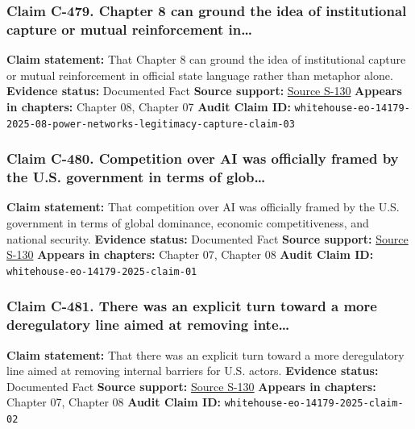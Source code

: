 \documentclass[
  american,
  11pt,
  letterpaper,
]{article}
\begin{document}
\subsubsection{Claim C-479. Chapter 8 can ground the idea of
institutional capture or mutual reinforcement
in\ldots{}}\label{claim-c-479-chapter-8-can-ground-the-idea-of-institutional-capture-or-mutual-reinforcement-in}

\textbf{Claim statement:} That Chapter 8 can ground the idea of
institutional capture or mutual reinforcement in official state language
rather than metaphor alone. \textbf{Evidence status:} Documented Fact
\textbf{Source support:}
\hyperref[source-s-130-removing-barriers-to-american-leadership-in-artificial-intelligence]{Source
S-130} \textbf{Appears in chapters:} Chapter 08, Chapter 07
\textbf{Audit Claim ID:}
\texttt{whitehouse-eo-14179-2025-08-power-networks-legitimacy-capture-claim-03}

\subsubsection{Claim C-480. Competition over AI was officially framed by
the U.S. government in terms of
glob\ldots{}}\label{claim-c-480-competition-over-ai-was-officially-framed-by-the-u-s-government-in-terms-of-glob}

\textbf{Claim statement:} That competition over AI was officially framed
by the U.S. government in terms of global dominance, economic
competitiveness, and national security. \textbf{Evidence status:}
Documented Fact \textbf{Source support:}
\hyperref[source-s-130-removing-barriers-to-american-leadership-in-artificial-intelligence]{Source
S-130} \textbf{Appears in chapters:} Chapter 07, Chapter 08
\textbf{Audit Claim ID:} \texttt{whitehouse-eo-14179-2025-claim-01}

\subsubsection{Claim C-481. There was an explicit turn toward a more
deregulatory line aimed at removing
inte\ldots{}}\label{claim-c-481-there-was-an-explicit-turn-toward-a-more-deregulatory-line-aimed-at-removing-inte}

\textbf{Claim statement:} That there was an explicit turn toward a more
deregulatory line aimed at removing internal barriers for U.S. actors.
\textbf{Evidence status:} Documented Fact \textbf{Source support:}
\hyperref[source-s-130-removing-barriers-to-american-leadership-in-artificial-intelligence]{Source
S-130} \textbf{Appears in chapters:} Chapter 07, Chapter 08
\textbf{Audit Claim ID:} \texttt{whitehouse-eo-14179-2025-claim-02}
\end{document}
